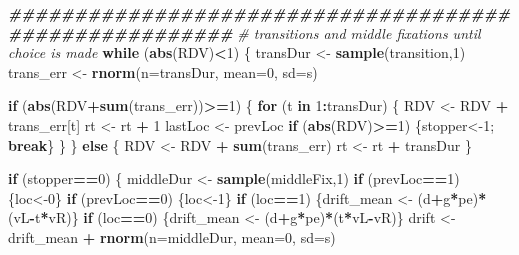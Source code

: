 \documentclass[
]{book}
\newenvironment{Shaded}{\begin{snugshade}}{\end{snugshade}}
\newcommand{\AttributeTok}[1]{\textcolor[rgb]{0.13,0.29,0.53}{#1}}
\newcommand{\CommentTok}[1]{\textcolor[rgb]{0.56,0.35,0.01}{\textit{#1}}}
\newcommand{\ControlFlowTok}[1]{\textcolor[rgb]{0.13,0.29,0.53}{\textbf{#1}}}
\newcommand{\DecValTok}[1]{\textcolor[rgb]{0.00,0.00,0.81}{#1}}
\newcommand{\DocumentationTok}[1]{\textcolor[rgb]{0.56,0.35,0.01}{\textbf{\textit{#1}}}}
\newcommand{\FunctionTok}[1]{\textcolor[rgb]{0.13,0.29,0.53}{\textbf{#1}}}
\newcommand{\NormalTok}[1]{#1}
\newcommand{\OtherTok}[1]{\textcolor[rgb]{0.56,0.35,0.01}{#1}}
\newcommand{\SpecialCharTok}[1]{\textcolor[rgb]{0.81,0.36,0.00}{\textbf{#1}}}
\begin{document}
\begin{Shaded}
\begin{Highlighting}[]
  \DocumentationTok{\#\#\#\#\#\#\#\#\#\#\#\#\#\#\#\#\#\#\#\#\#\#\#\#\#\#\#\#\#\#\#\#\#\#\#\#\#\#\#\#\#\#\#\#\#\#\#\#\#\#\#\#\#\#\#}
  \CommentTok{\# transitions and middle fixations until choice is made}
  \ControlFlowTok{while}\NormalTok{ (}\FunctionTok{abs}\NormalTok{(RDV)}\SpecialCharTok{\textless{}}\DecValTok{1}\NormalTok{) \{}
\NormalTok{    transDur }\OtherTok{\textless{}{-}} \FunctionTok{sample}\NormalTok{(transition,}\DecValTok{1}\NormalTok{)}
\NormalTok{    trans\_err }\OtherTok{\textless{}{-}} \FunctionTok{rnorm}\NormalTok{(}\AttributeTok{n=}\NormalTok{transDur, }\AttributeTok{mean=}\DecValTok{0}\NormalTok{, }\AttributeTok{sd=}\NormalTok{s)}
    
    \ControlFlowTok{if}\NormalTok{ (}\FunctionTok{abs}\NormalTok{(RDV}\SpecialCharTok{+}\FunctionTok{sum}\NormalTok{(trans\_err))}\SpecialCharTok{\textgreater{}=}\DecValTok{1}\NormalTok{) \{}
      \ControlFlowTok{for}\NormalTok{ (t }\ControlFlowTok{in} \DecValTok{1}\SpecialCharTok{:}\NormalTok{transDur) \{}
\NormalTok{        RDV }\OtherTok{\textless{}{-}}\NormalTok{ RDV }\SpecialCharTok{+}\NormalTok{ trans\_err[t]}
\NormalTok{        rt }\OtherTok{\textless{}{-}}\NormalTok{ rt }\SpecialCharTok{+} \DecValTok{1}
\NormalTok{        lastLoc }\OtherTok{\textless{}{-}}\NormalTok{ prevLoc}
        \ControlFlowTok{if}\NormalTok{ (}\FunctionTok{abs}\NormalTok{(RDV)}\SpecialCharTok{\textgreater{}=}\DecValTok{1}\NormalTok{) \{stopper}\OtherTok{\textless{}{-}}\DecValTok{1}\NormalTok{; }\ControlFlowTok{break}\NormalTok{\}}
\NormalTok{      \}}
\NormalTok{    \} }\ControlFlowTok{else}\NormalTok{ \{}
\NormalTok{      RDV }\OtherTok{\textless{}{-}}\NormalTok{ RDV }\SpecialCharTok{+} \FunctionTok{sum}\NormalTok{(trans\_err)}
\NormalTok{      rt }\OtherTok{\textless{}{-}}\NormalTok{ rt }\SpecialCharTok{+}\NormalTok{ transDur}
\NormalTok{    \}}
    
    \ControlFlowTok{if}\NormalTok{ (stopper}\SpecialCharTok{==}\DecValTok{0}\NormalTok{) \{}
\NormalTok{      middleDur }\OtherTok{\textless{}{-}} \FunctionTok{sample}\NormalTok{(middleFix,}\DecValTok{1}\NormalTok{)}
      \ControlFlowTok{if}\NormalTok{ (prevLoc}\SpecialCharTok{==}\DecValTok{1}\NormalTok{) \{loc}\OtherTok{\textless{}{-}}\DecValTok{0}\NormalTok{\}}
      \ControlFlowTok{if}\NormalTok{ (prevLoc}\SpecialCharTok{==}\DecValTok{0}\NormalTok{) \{loc}\OtherTok{\textless{}{-}}\DecValTok{1}\NormalTok{\}}
      \ControlFlowTok{if}\NormalTok{ (loc}\SpecialCharTok{==}\DecValTok{1}\NormalTok{) \{drift\_mean }\OtherTok{\textless{}{-}}\NormalTok{ (d}\SpecialCharTok{+}\NormalTok{g}\SpecialCharTok{*}\NormalTok{pe)}\SpecialCharTok{*}\NormalTok{(vL}\SpecialCharTok{{-}}\NormalTok{t}\SpecialCharTok{*}\NormalTok{vR)\}}
      \ControlFlowTok{if}\NormalTok{ (loc}\SpecialCharTok{==}\DecValTok{0}\NormalTok{) \{drift\_mean }\OtherTok{\textless{}{-}}\NormalTok{ (d}\SpecialCharTok{+}\NormalTok{g}\SpecialCharTok{*}\NormalTok{pe)}\SpecialCharTok{*}\NormalTok{(t}\SpecialCharTok{*}\NormalTok{vL}\SpecialCharTok{{-}}\NormalTok{vR)\}}
\NormalTok{      drift }\OtherTok{\textless{}{-}}\NormalTok{ drift\_mean }\SpecialCharTok{+} \FunctionTok{rnorm}\NormalTok{(}\AttributeTok{n=}\NormalTok{middleDur, }\AttributeTok{mean=}\DecValTok{0}\NormalTok{, }\AttributeTok{sd=}\NormalTok{s)}
    

\end{Highlighting}
\end{Shaded}
\end{document}
